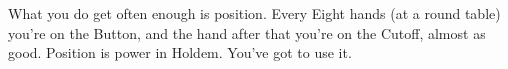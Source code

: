What you do get often enough is position. Every Eight hands (at a
round table) you're on the Button, and the hand after that you're on
the Cutoff, almost as good. Position is power in Holdem. You've got to
use it.








